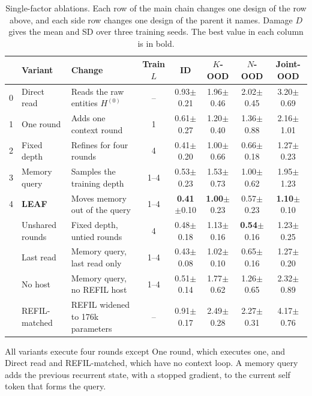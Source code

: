 \begin{table}[!t]
\centering
\footnotesize
\setlength{\tabcolsep}{2.5pt}
\caption{Single-factor ablations. Each row of the main chain changes one design of the row above, and each side row changes one design of the parent it names. Damage $D$ gives the mean and SD over three training seeds. The best value in each column is in bold.}
\label{tab:exp-ablation}
\begin{tabular}{@{}cl l c cccc@{}}
\toprule
& Variant & Change & Train $L$ & ID & $K$-OOD & $N$-OOD & Joint-OOD\\
\midrule
0 & Direct read & Reads the raw entities $H^{(0)}$ & -- & 0.93$\pm$0.21 & 1.96$\pm$0.46 & 2.02$\pm$0.45 & 3.20$\pm$0.69\\
1 & One round & Adds one context round & 1 & 0.61$\pm$0.27 & 1.20$\pm$0.40 & 1.36$\pm$0.88 & 2.16$\pm$1.01\\
2 & Fixed depth & Refines for four rounds & 4 & 0.41$\pm$0.20 & 1.00$\pm$0.66 & 0.66$\pm$0.18 & 1.27$\pm$0.23\\
3 & Memory query & Samples the training depth & 1--4 & 0.53$\pm$0.23 & 1.53$\pm$0.73 & 1.00$\pm$0.62 & 1.95$\pm$1.23\\
4 & \textbf{LEAF} & Moves memory out of the query & 1--4 & \textbf{0.41}$\pm$0.10 & \textbf{1.00}$\pm$0.23 & 0.57$\pm$0.23 & \textbf{1.10}$\pm$0.10\\
\midrule
& Unshared rounds & Fixed depth, untied rounds & 4 & 0.48$\pm$0.18 & 1.13$\pm$0.16 & \textbf{0.54}$\pm$0.16 & 1.23$\pm$0.25\\
& Last read & Memory query, last read only & 1--4 & 0.43$\pm$0.08 & 1.02$\pm$0.10 & 0.65$\pm$0.16 & 1.27$\pm$0.20\\
& No host & Memory query, no REFIL host & 1--4 & 0.51$\pm$0.14 & 1.77$\pm$0.62 & 1.26$\pm$0.65 & 2.32$\pm$0.89\\
& REFIL-matched & REFIL widened to 176k parameters & -- & 0.91$\pm$0.17 & 2.49$\pm$0.28 & 2.27$\pm$0.31 & 4.17$\pm$0.76\\
\bottomrule
\end{tabular}
\vspace{2pt}

\parbox{\textwidth}{\footnotesize All variants execute four rounds except One round, which executes one, and Direct read and REFIL-matched, which have no context loop. A memory query adds the previous recurrent state, with a stopped gradient, to the current self token that forms the query.}
\end{table}

